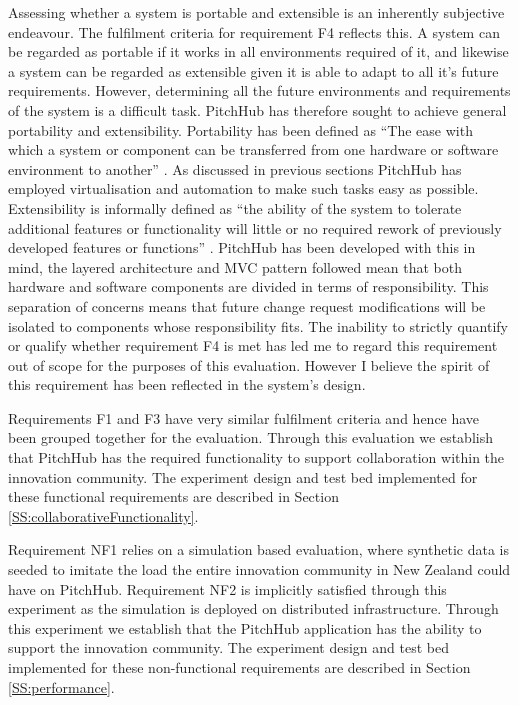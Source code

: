 Assessing whether a system is portable and extensible is an inherently subjective endeavour. The fulfilment criteria for requirement F4 reflects this. A system can be regarded as portable if it works in all environments required of it, and likewise a system can be regarded as extensible given it is able to adapt to all it's future requirements. However, determining all the future environments and requirements of the system is a difficult task. PitchHub has therefore sought to achieve general portability and extensibility. Portability has been defined as ``The ease with which a system or component can be transferred from one hardware or software environment to another'' \cite{mattsson2006software}. As discussed in previous sections PitchHub has employed virtualisation and automation to make such tasks easy as possible. Extensibility is informally defined as ``the ability of the system to tolerate additional features or functionality will little or no required rework of previously developed features or functions'' \cite{Extensibility:online}. PitchHub has been developed with this in mind, the layered architecture and MVC pattern followed mean that both hardware and software components are divided in terms of responsibility. This separation of concerns means that future change request modifications will be isolated to components whose responsibility fits. The inability to strictly quantify or qualify whether requirement F4 is met has led me to regard this requirement out of scope for the purposes of this evaluation. However I believe the spirit of this requirement has been reflected in the system's design.
\par
Requirements F1 and F3 have very similar fulfilment criteria and hence have been grouped together for the evaluation. Through this evaluation we establish that PitchHub has the required functionality to support collaboration within the innovation community. The experiment design and test bed implemented for these functional requirements are described in Section \ref{SS:collaborativeFunctionality}.
\par
Requirement NF1 relies on a simulation based evaluation, where synthetic data is seeded to imitate the load the entire innovation community in New Zealand could have on PitchHub. Requirement NF2 is implicitly satisfied through this experiment as the simulation is deployed on distributed infrastructure. Through this experiment we establish that the PitchHub application has the ability to support the innovation community. The experiment design and test bed implemented for these non-functional requirements are described in Section \ref{SS:performance}.

